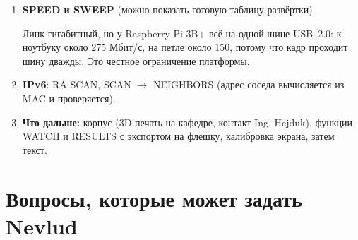 \documentclass[a4paper,11pt]{article}
\begin{document}
\begin{enumerate}[label=\textbf{\arabic*.},leftmargin=1.6em]
  \begin{say}
  Одна кнопка отвечает, что с розеткой: линк, DHCP, IPv6, шлюз, DNS, доступность сайта. Адрес берётся
  только на время теста и возвращается серверу. Если в сети два DHCP-сервера, будет WARN с адресами
  обоих.
  \end{say}
\item \textbf{SPEED и SWEEP} (можно показать готовую таблицу развёртки).
  \begin{say}
  Линк гигабитный, но у Raspberry Pi 3B+ всё на одной шине USB~2.0: к ноутбуку около 275 Мбит/с, на
  петле около 150, потому что кадр проходит шину дважды. Это честное ограничение платформы.
  \end{say}
\item \textbf{IPv6}: RA SCAN, SCAN $\rightarrow$ NEIGHBORS (адрес соседа вычисляется из MAC и проверяется).
\item \textbf{Что дальше:} корпус (3D-печать на кафедре, контакт Ing. Hejduk), функции WATCH и RESULTS с
  экспортом на флешку, калибровка экрана, затем текст.
\end{enumerate}

\section{Вопросы, которые может задать Nevlud}
\end{document}

